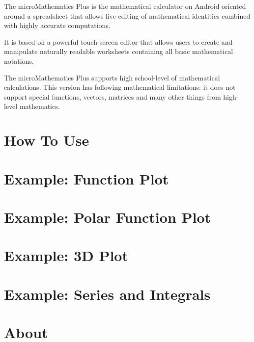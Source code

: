 \documentclass[DIV=calc, paper=a4, fontsize=11pt, twocolumn]{scrartcl}
\begin{document}
\maketitle
\thispagestyle{fancy} %

\begin{bf}
The microMathematics Plus is the
mathematical calculator on Android
oriented around a spreadsheet that
allows live editing of mathematical
identities combined with highly
accurate computations.

It is based on a powerful touch-screen
editor that allows users to create and
manipulate naturally readable
worksheets containing all basic
mathematical notations.

The microMathematics Plus supports
high school-level of mathematical
calculations. This version has
following mathematical limitations: it
does not support special functions,
vectors, matrices and many other
things from high-level mathematics.
\end{bf}

\section{How To Use}


\section{Example: Function Plot}


\section{Example: Polar Function Plot}


\section{Example: 3D Plot}


\section{Example: Series and Integrals}


\section{About}
\end{document}

